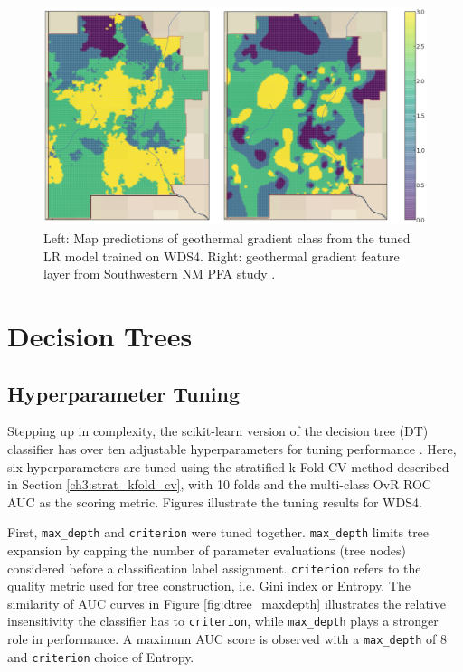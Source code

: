 \begin{figure}[!htp]
\centering
\includegraphics[width=\textwidth]{templates/images/Figure-LR-FinalMap_Joint.png}
\caption[Logistic regression prediction map]{Left: Map predictions of geothermal gradient class from the tuned LR model trained on WDS4. Right: geothermal gradient feature layer from Southwestern NM PFA study \protect\citep{bielicki_hydrogeolgic_2015}.}
\label{fig:logreg_final_map}
\end{figure}

\section{Decision Trees}\label{ch5:dtree_model}
\subsection{Hyperparameter Tuning}\label{ch5:dtree_tuning}
Stepping up in complexity, the scikit-learn version of the decision tree (DT) classifier has over ten adjustable hyperparameters for tuning performance \citep{pedregosa_scikit-learn_2011}. Here, six hyperparameters are tuned using the stratified k-Fold CV method described in Section \ref{ch3:strat_kfold_cv}, with 10 folds and the multi-class OvR ROC AUC as the scoring metric. Figures illustrate the tuning results for WDS4.

First, \verb|max_depth| and \verb|criterion| were tuned together. \verb|max_depth| limits tree expansion by capping the number of parameter evaluations (tree nodes) considered before a classification label assignment. \verb|criterion| refers to the quality metric used for tree construction, i.e. Gini index or Entropy. The similarity of AUC curves in Figure \ref{fig:dtree_maxdepth} illustrates the relative insensitivity the classifier has to \verb|criterion|, while \verb|max_depth| plays a stronger role in performance. A maximum AUC score is observed with a \verb|max_depth| of 8 and \verb|criterion| choice of Entropy.

